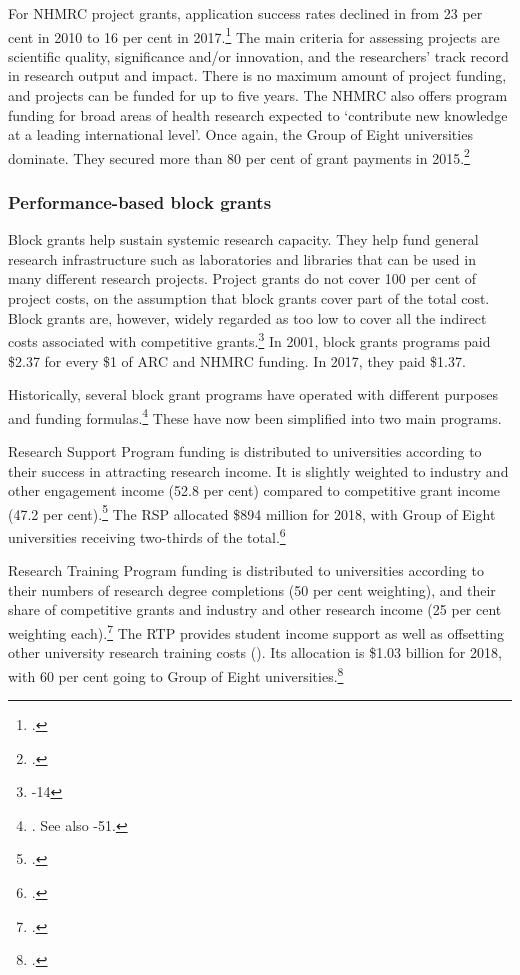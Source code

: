 \documentclass{grattan}
\begin{document}
For NHMRC project grants, application success rates declined in from 23 per cent in 2010 to 16 per cent in 2017.\footcite[][]{NHMRC2017summaryofthenhmr} The main criteria for assessing projects are scientific quality, significance and/or innovation, and the researchers' track record in research output and impact. There is no maximum amount of project funding, and projects can be funded for up to five years. The NHMRC also offers program funding for broad areas of health research expected to `contribute new knowledge at a leading international level'. Once again, the Group of Eight universities dominate. They secured more than 80 per cent of grant payments in 2015.\footcite[][]{NHMRC2015summaryofthenhmr}

%
\subsubsection{Performance-based block grants}\label{subsubsec:performance-based-block-grants}

Block grants help sustain systemic research capacity. They help fund general research infrastructure such as laboratories and libraries that can be used in many different research projects. Project grants do not cover 100 per cent of project costs, on the assumption that block grants cover part of the total cost. Block grants are, however, widely regarded as too low to cover all the indirect costs associated with competitive grants.\footnote{\textcite[][13]{Watt2015reviewofresearch}-14} In 2001, block grants programs paid \$2.37 for every \$1 of ARC and NHMRC funding. In 2017, they paid \$1.37.

Historically, several block grant programs have operated with different purposes and funding formulas.\footnote{\textcite[][]{Larkins2011australianhighere}. See also \textcite[][50]{Norton2014mappingaustralian}-51.} These have now been simplified into two main programs.

Research Support Program funding is distributed to universities according to their success in attracting research income. It is slightly weighted to industry and other engagement income (52.8 per cent) compared to competitive grant income (47.2 per cent).\footcite[][]{DepartmentofEducationandTraining2017researchblockgran} The RSP allocated \$894 million for 2018, with Group of Eight universities receiving two-thirds of the total.\footcite[][]{DepartmentofEducationandTraining2017researchincomeand}

Research Training Program funding is distributed to universities according to their numbers of research degree completions (50 per cent weighting), and their share of competitive grants and industry and other research income (25 per cent weighting each).\footcite[][]{DepartmentofEducationandTraining2017researchblockgran} The RTP provides student income support as well as offsetting other university research training costs (). Its allocation is \$1.03 billion for 2018, with 60 per cent going to Group of Eight universities.\footcite[][]{DepartmentofEducationandTraining2017researchincomeand}
\end{document}
